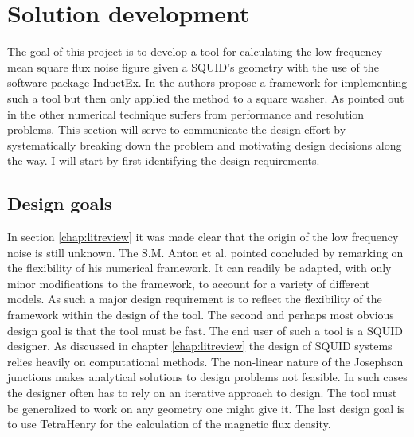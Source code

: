 \graphicspath{{solutiondevelopment/fig/}}

\chapter{Solution development}
\label{chap:solutiondevelopment}
The goal of this project is to develop a tool for calculating the low frequency mean square flux noise figure given a SQUID's geometry with the use of the software package InductEx. In \cite{fluxNoiseSquidsStevenAnton} the authors propose a framework for implementing such a tool but then only applied the method to a square washer. As pointed out in \cite{fluxNoiseSquidsStevenAnton} the other numerical technique suffers from performance and resolution problems. This section will serve to communicate the design effort by systematically breaking down the problem and motivating design decisions along the way. I will start by first identifying the design requirements.

\section{Design goals}
In section \ref{chap:litreview} it was made clear that the origin of the low frequency noise is still unknown. The S.M. Anton et al. pointed concluded \cite{fluxNoiseSquidsStevenAnton} by remarking on the flexibility of his numerical framework. It can readily be adapted, with only minor modifications to the framework, to account for a variety of different models. As such a major design requirement is to reflect the flexibility of the framework within the design of the tool.
The second and perhaps most obvious design goal is that the tool must be fast. The end user of such a tool is a SQUID designer. As discussed in chapter \ref{chap:litreview} the design of SQUID systems relies heavily on computational methods. The non-linear nature of the Josephson junctions makes analytical solutions to design problems not feasible. In such cases the designer often has to rely on an iterative approach to design.
The tool must be generalized to work on any geometry one might give it.
The last design goal is to use TetraHenry for the calculation of the magnetic flux density. 

